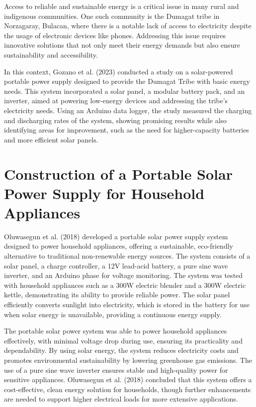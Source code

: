 {Access to reliable and sustainable energy is a critical issue in many rural and indigenous communities. One such community is the Dumagat tribe in Norzagaray, Bulacan, where there is a notable lack of access to electricity despite the usage of electronic devices like phones. Addressing this issue requires innovative solutions that not only meet their energy demands but also ensure sustainability and accessibility. 

In this context, Gozano et al. (2023) conducted a study on a solar-powered portable power supply designed to provide the Dumagat Tribe with basic energy needs. This system incorporated a solar panel, a modular battery pack, and an inverter, aimed at powering low-energy devices and addressing the tribe’s electricity needs. Using an Arduino data logger, the study measured the charging and discharging rates of the system, showing promising results while also identifying areas for improvement, such as the need for higher-capacity batteries and more efficient solar panels.

\section{Construction of a Portable Solar Power Supply for Household Appliances}

Oluwasegun et al. (2018) developed a portable solar power supply system designed to power household appliances, offering a sustainable, eco-friendly alternative to traditional non-renewable energy sources. The system consists of a solar panel, a charge controller, a 12V lead-acid battery, a pure sine wave inverter, and an Arduino phase for voltage monitoring. The system was tested with household appliances such as a 300W electric blender and a 300W electric kettle, demonstrating its ability to provide reliable power. The solar panel efficiently converts sunlight into electricity, which is stored in the battery for use when solar energy is unavailable, providing a continuous energy supply.

The portable solar power system was able to power household appliances effectively, with minimal voltage drop during use, ensuring its practicality and dependability. By using solar energy, the system reduces electricity costs and promotes environmental sustainability by lowering greenhouse gas emissions. The use of a pure sine wave inverter ensures stable and high-quality power for sensitive appliances. Oluwasegun et al. (2018) concluded that this system offers a cost-effective, clean energy solution for households, though further enhancements are needed to support higher electrical loads for more extensive applications.

}
